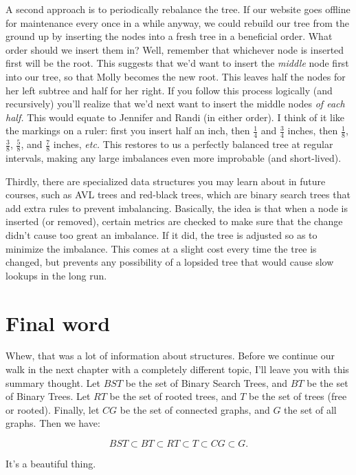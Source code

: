 A second approach is to periodically rebalance the tree. If our website
goes offline for maintenance every once in a while anyway, we could rebuild
our tree from the ground up by inserting the nodes into a fresh tree in a
beneficial order. What order should we insert them in? Well, remember that
whichever node is inserted first will be the root. This suggests that we'd
want to insert the \textit{middle} node first into our tree, so that Molly
becomes the new root. This leaves half the nodes for her left subtree and
half for her right. If you follow this process logically (and recursively)
you'll realize that we'd next want to insert the middle nodes \textit{of
each half.} This would equate to Jennifer and Randi (in either order). I
think of it like the markings on a ruler: first you insert half an inch,
then $\frac{1}{4}$ and $\frac{3}{4}$ inches, then $\frac{1}{8}$,
$\frac{3}{8}$, $\frac{5}{8}$, and $\frac{7}{8}$ inches, \textit{etc.} This
restores to us a perfectly balanced tree at regular intervals, making any
large imbalances even more improbable (and short-lived).

Thirdly, there are specialized data structures you may learn about in
future courses, such as AVL trees and red-black trees, which are binary
search trees that add extra rules to prevent imbalancing. Basically, the
idea is that when a node is inserted (or removed), certain metrics are
checked to make sure that the change didn't cause too great an imbalance.
If it did, the tree is adjusted so as to minimize the imbalance. This comes
at a slight cost every time the tree is changed, but prevents any
possibility of a lopsided tree that would cause slow lookups in the long
run.

\section{Final word}

Whew, that was a lot of information about structures. Before we continue
our walk in the next chapter with a completely different topic, I'll leave
you with this summary thought. Let $BST$ be the set of Binary Search Trees,
and $BT$ be the set of Binary Trees. Let $RT$ be the set of rooted trees,
and $T$ be the set of trees (free or rooted). Finally, let $CG$ be the set
of connected graphs, and $G$ the set of all graphs. Then we have:

\[
BST \subset BT \subset RT \subset T \subset CG \subset G.
\]

It's a beautiful thing.
